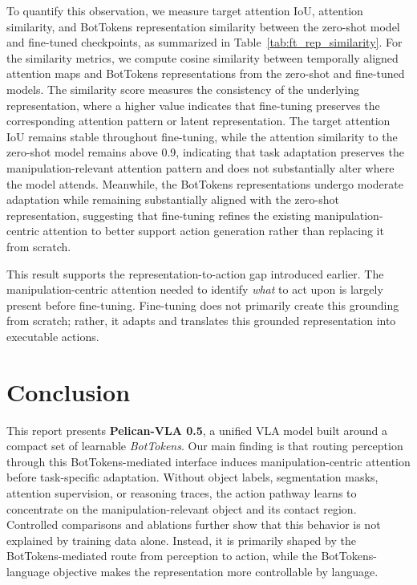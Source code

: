 \documentclass[a4paper,table]{extarticle}
\begin{document}
To quantify this observation, we measure target attention IoU, attention similarity, and BotTokens representation similarity between the zero-shot model and fine-tuned checkpoints, as summarized in Table~\ref{tab:ft_rep_similarity}. For the similarity metrics, we compute cosine similarity between temporally aligned attention maps and BotTokens representations from the zero-shot and fine-tuned models. The similarity score measures the consistency of the underlying representation, where a higher value indicates that fine-tuning preserves the corresponding attention pattern or latent representation. The target attention IoU remains stable throughout fine-tuning, while the attention similarity to the zero-shot model remains above 0.9, indicating that task adaptation preserves the manipulation-relevant attention pattern and does not substantially alter where the model attends. Meanwhile, the BotTokens representations undergo moderate adaptation while remaining substantially aligned with the zero-shot representation, suggesting that fine-tuning refines the existing manipulation-centric attention to better support action generation rather than replacing it from scratch.

This result supports the representation-to-action gap introduced earlier. The manipulation-centric attention needed to identify \emph{what} to act upon is largely present before fine-tuning. Fine-tuning does not primarily create this grounding from scratch; rather, it adapts and translates this grounded representation into executable actions. 



\section{Conclusion}
\label{sec:conclusion}
This report presents \textbf{Pelican-VLA 0.5}, a unified VLA model built around a compact set of learnable \emph{BotTokens}. Our main finding is that routing perception through this BotTokens-mediated interface induces manipulation-centric attention before task-specific adaptation. Without object labels, segmentation masks, attention supervision, or reasoning traces, the action pathway learns to concentrate on the manipulation-relevant object and its contact region. Controlled comparisons and ablations further show that this behavior is not explained by training data alone. Instead, it is primarily shaped by the BotTokens-mediated route from perception to action, while the BotTokens-language objective makes the representation more controllable by language.
\end{document}
